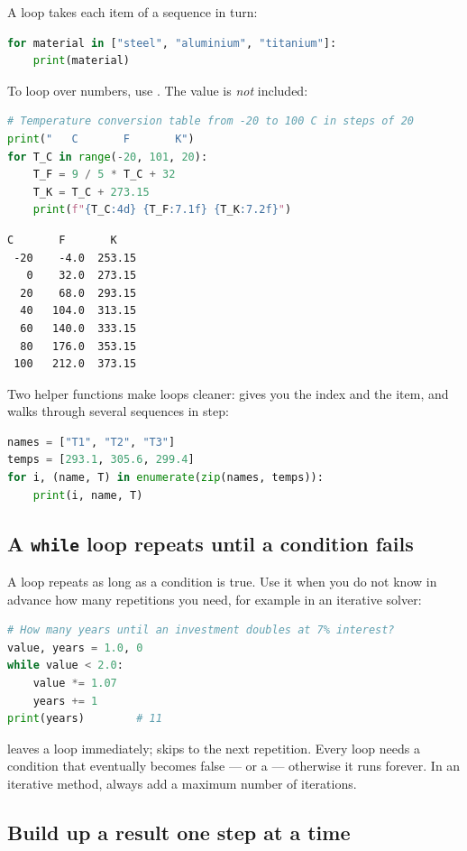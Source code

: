 A  loop takes each item of a sequence in turn:
\begin{lstlisting}[language=Python]
for material in ["steel", "aluminium", "titanium"]:
    print(material)
\end{lstlisting}
To loop over numbers, use . The  value is
\emph{not} included:
\begin{lstlisting}[language=Python]
# Temperature conversion table from -20 to 100 C in steps of 20
print("   C       F       K")
for T_C in range(-20, 101, 20):
    T_F = 9 / 5 * T_C + 32
    T_K = T_C + 273.15
    print(f"{T_C:4d} {T_F:7.1f} {T_K:7.2f}")
\end{lstlisting}
\begin{lstlisting}[style=output]
   C       F       K
 -20    -4.0  253.15
   0    32.0  273.15
  20    68.0  293.15
  40   104.0  313.15
  60   140.0  333.15
  80   176.0  353.15
 100   212.0  373.15
\end{lstlisting}
Two helper functions make loops cleaner:  gives you the index and the item,
and  walks through several sequences in step:
\begin{lstlisting}[language=Python]
names = ["T1", "T2", "T3"]
temps = [293.1, 305.6, 299.4]
for i, (name, T) in enumerate(zip(names, temps)):
    print(i, name, T)
\end{lstlisting}

\subsection*{A \texttt{while} loop repeats until a condition fails}

A  loop repeats as long as a condition is true. Use it when you do not know in
advance how many repetitions you need, for example in an iterative solver:
\begin{lstlisting}[language=Python]
# How many years until an investment doubles at 7% interest?
value, years = 1.0, 0
while value < 2.0:
    value *= 1.07
    years += 1
print(years)        # 11
\end{lstlisting}
 leaves a loop immediately;  skips to the next repetition.
Every  loop needs a condition that eventually becomes false --- or a
 --- otherwise it runs forever. In an iterative method, always add a maximum
number of iterations.

\subsection*{Build up a result one step at a time}

